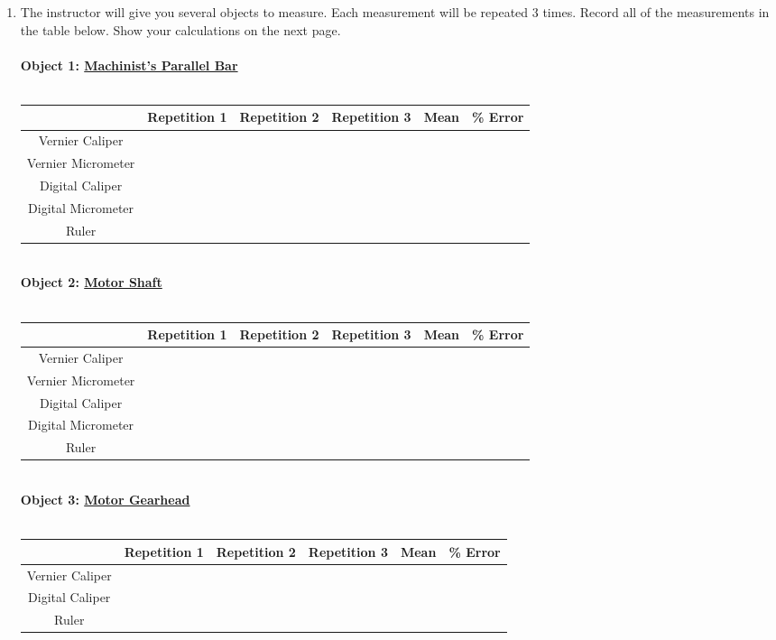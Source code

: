 \documentclass[11pt]{article}
\newcommand{\CW}{20mm}
\begin{document}
\begin{description}
\begin{enumerate}
 			\item The instructor will give you several objects to measure. Each measurement will be repeated 3 times. Record all of the measurements in the table below. Show your calculations on the next page.\\\\
 			
 			\renewcommand{\arraystretch}{1.4}
 		         \textbf{ Object 1: \underline{ Machinist’s Parallel Bar }}\\\\
 			\begin{tabular}{|c|c|c|c|m{\CW}|m{\CW}|}\hline
 			& Repetition 1& Repetition 2& Repetition 3&Mean&\% Error \\   \hline 
 			Vernier Caliper&\hspace{\CW}&&&&\\ \hline
 			Vernier Micrometer&&&&&\\    \hline
 			Digital Caliper&&&&&\\   \hline
 			Digital Micrometer&&&&&\\   \hline
 			Ruler&&&&&\\   \hline		
 			\end{tabular}
 			\vspace{10mm}\\
 			\renewcommand{\arraystretch}{1.4}
 		        \textbf{ Object 2: \underline{Motor Shaft}}\\\\
 			\begin{tabular}{|c|c|c|c|m{\CW}|m{\CW}|}\hline
 			& Repetition 1& Repetition 2& Repetition 3&Mean&\% Error \\   \hline 
 			Vernier Caliper&\hspace{\CW}&&&&\\ \hline
 			Vernier Micrometer&&&&&\\    \hline
 			Digital Caliper&&&&&\\   \hline
 			Digital Micrometer&&&&&\\   \hline
 			Ruler&&&&&\\   \hline		
 			\end{tabular}
 			\vspace{10mm}\\
 			\renewcommand{\arraystretch}{1.4}
 		         \textbf{ Object 3: \underline{  Motor Gearhead  }}\\\\
 			\begin{tabular}{|c|c|c|c|m{\CW}|m{\CW}|}\hline
 			& Repetition 1& Repetition 2& Repetition 3&Mean&\% Error \\   \hline 
 			Vernier Caliper&\hspace{\CW}&&&&\\ \hline
 			Digital Caliper&&&&&\\   \hline
 			Ruler&&&&&\\   \hline		
 			\end{tabular}
			

\end{enumerate}
\end{description}
\end{document}
